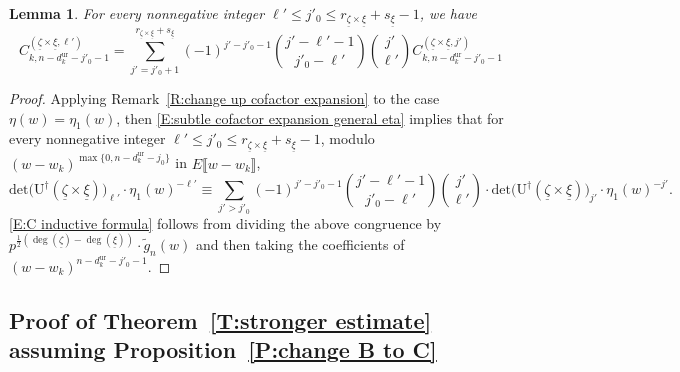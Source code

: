 \documentclass[12pt]{amsart}
\newtheorem{lemma}[subsection]{Lemma}
\theoremstyle{definition}
\numberwithin{equation}{subsection}
\def\rmU{\mathrm{U}}
\renewcommand{\det}{\mathrm{det}}
\newcommand{\ur}{\mathrm{ur}}
\begin{document}
\begin{lemma}
\label{L:C inductive formula}
For every nonnegative integer $\ell'\leq j'_0 \leq r_{\underline \zeta \times \underline \xi} + s_{\underline \xi}-1$,
we have
\begin{equation}
\label{E:C inductive formula}
C_{k, n-d_k^\ur-j'_0-1}^{(\underline \zeta \times \underline \xi, \ell')} = \sum _{j'=j'_0+1}^{r_{\underline \zeta \times \underline \xi}+ s_{\underline \xi}} (-1)^{j'-j'_0-1} \binom{j'-\ell'-1}{j'_0-\ell'} \binom{j'}{\ell'} C_{k, n-d_k^\ur-j'_0-1}^{(\underline \zeta \times \underline \xi, j')}
\end{equation}
\end{lemma}
\begin{proof}
Applying Remark~\ref{R:change up cofactor expansion} to the case $\eta(w) = \eta_1(w)$, then
\eqref{E:subtle cofactor expansion general eta} implies that for every nonnegative integer $\ell'\leq j'_0 \leq r_{\underline \zeta \times \underline \xi} + s_{\underline \xi}-1$, modulo $(w-w_k)^{\max\{0,n-d_k^\ur-j_0\}}$ in $E\llbracket w-w_k\rrbracket$,
$$
\det \big(\rmU^\dagger(\underline \zeta \times \underline \xi)\big)_{\ell'}\cdot \eta_1(w)^{-\ell'} \equiv   \sum_{j' > j'_0} (-1)^{j'-j'_0-1} \binom{j'-\ell'-1}{j'_0-\ell'} \binom{j'}{\ell'}\cdot \det \big(\rmU^\dagger(\underline \zeta \times \underline \xi)\big)_{j'} \cdot \eta_1(w)^{-j'} .
$$
\eqref{E:C inductive formula} follows from dividing the above congruence by $p^{\tfrac 12(\deg(\underline \zeta)-\deg(\underline \xi))}\cdot \tilde{g}_{n}(w)$ and then taking the coefficients of $(w-w_k)^{n-d_k^\ur-j'_0-1}$.
\end{proof}

\subsection{Proof of Theorem~\ref{T:stronger estimate} assuming Proposition~\ref{P:change B to C}}
\label{S:proof of all STs}
\end{document}
